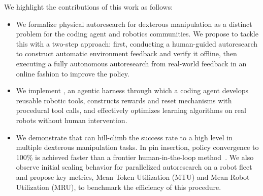 \noindent We highlight the contributions of this work as follows:
\begin{itemize}[leftmargin=*, topsep=2pt, itemsep=2pt, parsep=0pt, partopsep=0pt]
  \item We formalize physical autoresearch for dexterous manipulation as a distinct problem for the coding agent and robotics communities. We propose to tackle this with a two-step approach: first, conducting a human-guided autoresearch to construct automatic environment feedback and verify it offline, then executing a fully autonomous autoresearch from real-world feedback in an online fashion to improve the policy. 
  \item We implement \method, an agentic harness through which a coding agent develops reusable robotic tools, constructs rewards and reset mechanisms with procedural tool calls, and effectively optimizes learning algorithms on real robots without human intervention. 
  \item We demonstrate that \method can hill-climb the success rate to a high level in multiple dexterous manipulation tasks. In pin insertion, policy convergence to 100\% is achieved faster than a frontier human-in-the-loop method~\citep{pld}. We also observe initial scaling behavior for parallelized autoresearch on a robot fleet and propose key metrics, Mean Token Utilization (MTU) and Mean Robot Utilization (MRU), to benchmark the efficiency of this procedure. 
\end{itemize}






